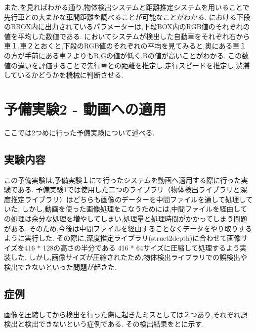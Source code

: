 また,を見ればわかる通り,物体検出システムと距離推定システムを用いることで先行車との大まかな車間距離を調べることが可能なことがわかる.
における下段のBBOX内に出力されているパラメーターは,下段BOX内のRGB値のそれぞれの値を平均した数値である.
においてシステムが検出した自動車をそれぞれ右から車１,車２とおくと,下段のRGB値のそれぞれの平均を見てみると,奥にある車１の方が手前にある車２よりもR,Gの値が低く,Bの値が高いことがわかる.
この数値の違いを評価することで先行車との距離を推定し,走行スピードを推定し,渋滞しているかどうかを機械に判断させる.


\newpage
\section{予備実験2 - 動画への適用}
ここでは2つめに行った予備実験について述べる.
\subsection{実験内容}
この予備実験は,予備実験１にて行ったシステムを動画へ適用する際に行った実験である.
予備実験1では使用した二つのライブラリ（物体検出ライブラリと深度推定ライブラリ）はどちらも画像のデーターを中間ファイルを通して処理していた.
しかし,動画を使った画像処理をこなうためには,中間ファイルを経由しての処理は余分な処理を増やしてしまい,処理量と処理時間がかかってしまう問題がある.
そのため,今後は中間ファイルを経由することなくデータをやり取りするように実行した.
その際に,深度推定ライブラリ(struct2depth)に合わせて画像サイズを416 * 128の高さの半分である 416 * 64サイズに圧縮して処理するよう実装した.
しかし,画像サイズが圧縮されたため,物体検出ライブラリでの誤検出や検出できないといった問題が起きた.

\subsection{症例}
画像を圧縮してから検出を行った際に起きたミスとしては２つあり,それぞれ誤検出と検出できないという症例である.
その検出結果をとに示す.

